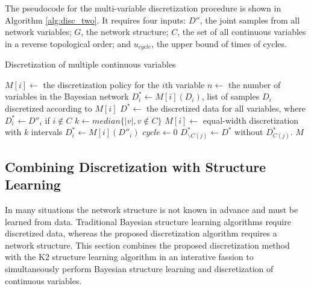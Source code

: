 The pseudocode for the multi-variable discretization procedure is shown in Algorithm \ref{alg:disc_two}.
It requires four inputs: $D''$, the joint samples from all network variables; $G$, the network structure; $C$, the set of all continuous variables in a reverse topological order; and $u_{cycle}$, the upper bound of times of cycles.

\begin{algorithm}
  \caption{Discretization of multiple continuous variables }
  \label{alg:disc_two}
  \begin{algorithmic}[5]
    \State
    \State $M[i] \leftarrow$ the discretization policy for the $i$th variable
    \State $n \leftarrow$ the number of variables in the Bayesian network
    \State $D^*_i \leftarrow M[i] (D_i)$, list of samples $D_i$ discretized according to $M[i]$
    \State $D^* \leftarrow $ the discretized data for all variables, where $D^*_i \leftarrow D''_i$ if $i \notin C$
    \State $k \leftarrow median\{ |v|, v\notin C\}$
    \State
        \State $M[i] \leftarrow$  equal-width discretization with $k$ intervals
        \State $D^*_i \leftarrow  M[i] (D''_i)$
      \EndIf
    \EndFor
    \State
    \State $cycle \leftarrow 0$
        \State $D^*_{\backslash C(j)} \leftarrow D^*$ without $D^*_{C(j)}$.
      \EndFor
    \EndWhile
    \State \Return $M$
  \EndFunction
  \end{algorithmic}
\end{algorithm}

\subsection{Combining Discretization with Structure Learning}

In many situations the network structure is not known in advance and must be learned from data.
Traditional Bayesian structure learning algorithms require discretized data, whereas the proposed discretization algorithm requires a network structure.
This section combines the proposed discretization method with the K2 structure learning algorithm \citep{K2} in an interative fassion to simultaneously perform Bayesian structure learning and discretization of continuous variables.

